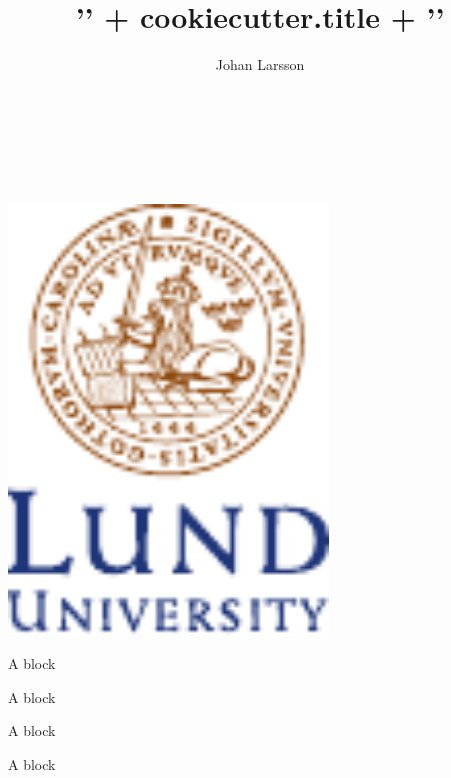 \documentclass[final,20pt]{beamer}
\title{{'{' + cookiecutter.title + '}'}}
\author[shortname]{\texorpdfstring{\alert{Johan Larsson}}{Johan Larsson}\inst{1,*}}
\newlength{\onecolwidth}
\newlength{\threecolwidth}
\newlength{\colheight}
\newlength{\titleheight}
\begin{document}
\begin{frame}[t]

\begin{minipage}[b][\titleheight][t]{\threecolwidth}%
  {\inserttitle\\[0.5ex]}
  {\insertauthor\\[1ex]}
  {\insertinstitute\\[1ex]}
\end{minipage}\hfill
\begin{minipage}[b][\titleheight][t]{\onecolwidth}%
  \hfill
  \includegraphics[height=4.5in]{lu}
\end{minipage}

%
\begin{minipage}[t][\colheight][t]{\onecolwidth}
  \begin{block}{A block}
    \blindtext
  \end{block}
\end{minipage}\hfill
%
%
\begin{minipage}[t][\colheight][t]{\onecolwidth}
  \begin{block}{A block}
    \blindtext
  \end{block}
\end{minipage}\hfill
%
%
\begin{minipage}[t][\colheight][t]{\onecolwidth}
  \begin{block}{A block}
    \blindtext
  \end{block}
\end{minipage}\hfill
%
%
\begin{minipage}[t][\colheight][t]{\onecolwidth}
  \begin{block}{A block}
    \blindtext
  \end{block}


\end{minipage}
\end{frame}
\end{document}
